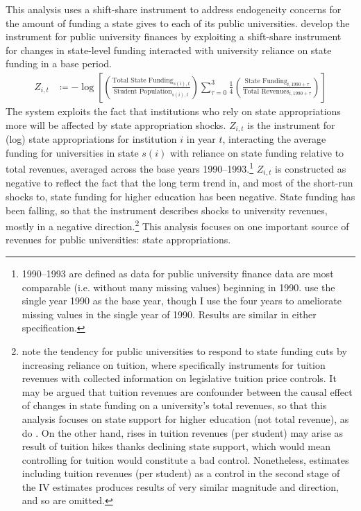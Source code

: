 This analysis uses a shift-share instrument to address endogeneity concerns for the amount of funding a state gives to each of its public universities.
\cite{NBERw23736,NBERw27885} develop the instrument for public university finances by exploiting a shift-share instrument for changes in state-level funding interacted with university reliance on state funding in a base period.
\begin{align}
    \label{eqn:public-instrument}
    Z_{i,t} &\coloneqq - \log \left[
    \left( \frac{\text{Total State Funding}_{s(i),t}}{\text{Student Population}_{s(i),t}} \right)
    \sum_{\tau = 0}^{3} \frac 14
    \left( \frac{\text{State Funding}_{i,1990 + \tau}}{\text{Total Revenues}_{i,1990 + \tau}} \right) \right]
\end{align}
The system exploits the fact that institutions who rely on state appropriations more will be affected by state appropriation shocks.
$Z_{i,t}$ is the instrument for (log) state appropriations for institution $i$ in year $t$, interacting the average funding for universities in state $s(i)$ with reliance on state funding relative to total revenues, averaged across the base years 1990--1993.\footnote{
    1990--1993 are defined as data for public university finance data are most comparable (i.e. without many missing values) beginning in 1990.
    \cite{NBERw23736} use the single year 1990 as the base year, though I use the four years to ameliorate missing values in the single year of 1990.
    Results are similar in either specification.
}
$Z_{i,t}$ is constructed as negative to reflect the fact that the long term trend in, and most of the short-run shocks to, state funding for higher education has been negative.
State funding has been falling, so that the instrument describes shocks to university revenues, mostly in a negative direction.\footnote{
    \label{foot:control}
    \cite{NBERw27885} note the tendency for public universities to respond to state funding cuts by increasing reliance on tuition, where \cite{NBERw23736} specifically instruments for tuition revenues with collected information on legislative tuition price controls.
    It may be argued that tuition revenues are confounder between the causal effect of changes in state funding on a university's total revenues, so that this analysis focuses on state support for higher education (not total revenue), as do \cite{NBERw27885}.
    On the other hand, rises in tuition revenues (per student) may arise as result of tuition hikes thanks declining state support, which would mean controlling for tuition would constitute a bad control.
    Nonetheless, estimates including tuition revenues (per student) as a control in the second stage of the IV estimates produces results of very similar magnitude and direction, and so are omitted.
}
This analysis focuses on one important source of revenues for public universities: state appropriations.

